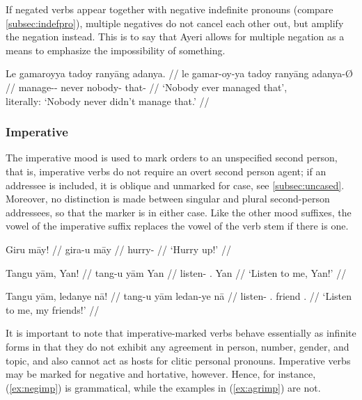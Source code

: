 \xe

If negated verbs appear together with negative indefinite pronouns (compare 
\autoref{subsec:indefpro}), multiple negatives do not cancel each other out, 
but amplify the negation instead. This is to say that Ayeri allows for multiple
negation as a means to emphasize the 
impossibility of something.

\ex
\begingl
	\gla Le gamaroyya tadoy ranyāng adanya. //
	\glb le gamar-oy-ya tadoy ranyāng adanya-Ø //
	\glc \PatTI{} manage-\Neg{}-\TsgM{} never nobody-\Aarg{} that-\Top{} //
	\glft `Nobody ever managed that',\\
		literally: `Nobody never didn't manage that.' //
\endgl
\xe


\subsubsection{Imperative}

The imperative mood is used to mark orders to an unspecified second person,
that is, imperative verbs do not require an overt second person agent; if an
addressee is included, it is oblique and unmarked for case, see
\autoref{subsec:uncased}. Moreover, no distinction is made between singular and
plural second-person addressees, so that the marker is  in either
case. Like the other mood suffixes, the vowel of the imperative suffix replaces
the vowel of the verb stem if there is one.

\pex
\a\begingl
	\gla Giru māy! //
	\glb gira-u māy //
	\glc hurry-\Imp{} \Int{} //
	\glft `Hurry up!' //
\endgl

\a\begingl
	\gla Tangu yām, Yan! //
	\glb tang-u yām Yan //
	\glc listen-\Imp{} \Fsg{}.\Dat{} Yan //
	\glft `Listen to me, Yan!' //
\endgl

\a\begingl
	\gla Tangu yām, ledanye nā! //
	\glb tang-u yām ledan-ye nā //
	\glc listen-\Imp{} \Fsg{}.\Dat{} friend \Fsg{}.\Gen{} //
	\glft `Listen to me, my friends!' //
\endgl

\xe

It is important to note that imperative-marked verbs behave essentially as
infinite forms in that they do not exhibit any  agreement in person, number,
gender, and topic, and also cannot act as hosts  for clitic personal pronouns.
Imperative verbs may be marked for negative and  hortative, however. Hence,
for instance, (\ref{ex:negimp}) is grammatical,  while the examples in
(\ref{ex:agrimp}) are not.

